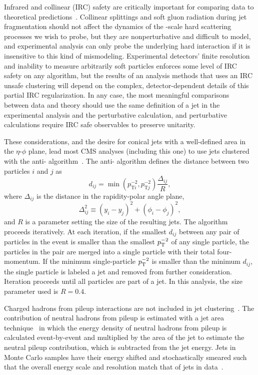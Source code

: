 Infrared and collinear (IRC) safety are critically important for comparing data to theoretical predictions~\cite{Salam:2009jx}.
Collinear splittings and soft gluon radiation during jet fragmentation should not affect the dynamics of the {\TeVns}-scale hard scattering processes we wish to probe, but they are nonperturbative and difficult to model, and experimental analysis can only probe the underlying hard interaction if it is insensitive to this kind of mismodeling.
Experimental detectors' finite resolution and inability to measure arbitrarily soft particles enforces some level of IRC safety on any algorithm, but the results of an analysis methods that uses an IRC unsafe clustering will depend on the complex, detector-dependent details of this partial IRC regularization.
In any case, the most meaningful comparisons between data and theory should use the same definition of a jet in the experimental analysis and the perturbative calculation, and perturbative calculations require IRC safe observables to preserve unitarity.

These considerations, and the desire for conical jets with a well-defined area in the $\eta$-$\phi$ plane, lead most CMS analyses (including this one) to use jets clustered with the anti-{\kt} algorithm~\cite{Cacciari:2008gp,Cacciari:2011ma}.
The anti-{\kt} algorithm defines the distance between two particles $i$ and $j$ as
\begin{equation}
  d_{ij} = \min\left(p_{\text{T}i}^{-2}, p_{\text{T}j}^{-2}\right) \frac{\Delta_{ij}}{R},
\end{equation}
where $\Delta_{ij}$ is the distance in the rapidity-polar angle plane,
\begin{equation}
  \Delta_{ij}^2 \equiv \left(y_i - y_j\right)^2 + \left(\phi_i - \phi_j\right)^2,
\end{equation}
and $R$ is a parameter setting the size of the resulting jets.
The algorithm proceeds iteratively.
At each iteration, if the smallest $d_{ij}$ between any pair of particles in the event is smaller than the smallest $p_\mathrm{T}^{-2}$ of any single particle, the particles in the pair are merged into a single particle with their total four-momentum.
If the minimum single-particle $p_\mathrm{T}^{-2}$ is smaller than the minimum $d_{ij}$, the single particle is labeled a jet and removed from further consideration.
Iteration proceeds until all particles are part of a jet.
In this analysis, the size parameter used is $R = 0.4$.

Charged hadrons from pileup interactions are not included in jet clustering~\cite{CMS:2014ata}.
The contribution of neutral hadrons from pileup is estimated with a jet area technique~\cite{Khachatryan:2016kdb,Cacciari:2008gn,Cacciari:2007fd} in which the energy density of neutral hadrons from pileup is calculated event-by-event and multiplied by the area of the jet to estimate the neutral pileup contribution, which is subtracted from the jet energy.
Jets in Monte Carlo samples have their energy shifted and stochastically smeared such that the overall energy scale and resolution match that of jets in data~\cite{Chatrchyan:2011ds,Khachatryan:2016kdb}.


